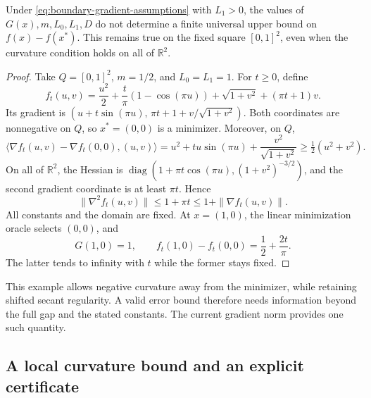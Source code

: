 \begin{proposition}
\label{prop:boundary-gap-obstruction}
Under \eqref{eq:boundary-gradient-assumptions} with $L_1>0$, the
values of $G(x),m,L_0,L_1,D$ do not determine a finite universal upper
bound on $f(x)-f(x^*)$. This remains true on the fixed square $[0,1]^2$,
even when the curvature condition holds on all of $\mathbb R^2$.
\end{proposition}
\begin{proof}
Take $Q=[0,1]^2$, $m=1/2$, and $L_0=L_1=1$. For $t\ge0$, define
\[
 f_t(u,v)=\frac{u^2}{2}+\frac t\pi(1-\cos(\pi u))
             +\sqrt{1+v^2}+(\pi t+1)v.
\]
Its gradient is
$(u+t\sin(\pi u),\,\pi t+1+v/\sqrt{1+v^2})$.
Both coordinates are nonnegative on $Q$, so $x^*=(0,0)$ is a minimizer.
Moreover, on $Q$,
\[
 \langle\nabla f_t(u,v)-\nabla f_t(0,0),(u,v)\rangle
 =u^2+tu\sin(\pi u)+\frac{v^2}{\sqrt{1+v^2}}
 \ge\tfrac12(u^2+v^2).
\]
On all of $\mathbb R^2$, the Hessian is
$\operatorname{diag}(1+\pi t\cos(\pi u),(1+v^2)^{-3/2})$,
and the second gradient coordinate is at least $\pi t$. Hence
\[
 \|\nabla^2 f_t(u,v)\|\le1+\pi t
 \le1+\|\nabla f_t(u,v)\|.
\]
All constants and the domain are fixed. At $x=(1,0)$, the linear
minimization oracle selects $(0,0)$, and
\[
 G(1,0)=1,\qquad
 f_t(1,0)-f_t(0,0)=\frac12+\frac{2t}{\pi}.
\]
The latter tends to infinity with $t$ while the former stays fixed.
\end{proof}

This example allows negative curvature away from the minimizer, while
retaining shifted secant regularity. A valid error bound therefore needs
information beyond the full gap and the stated constants. The current
gradient norm provides one such quantity.

\subsection{A local curvature bound and an explicit certificate}

